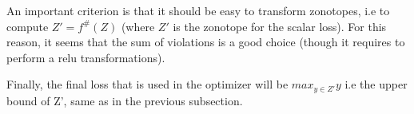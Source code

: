 \documentclass{article}
\begin{document}
An important criterion is that it should be easy to transform zonotopes, i.e to compute $Z' = f^{\#}(Z)$ (where $Z'$ is the zonotope for the scalar loss).
For this reason, it seems that the sum of violations is a good choice (though it requires to perform a relu transformations).

Finally, the final loss that is used in the optimizer will be $max_{y \in Z'} y$ i.e the upper bound of Z', same as in the previous subsection.
\end{document}
